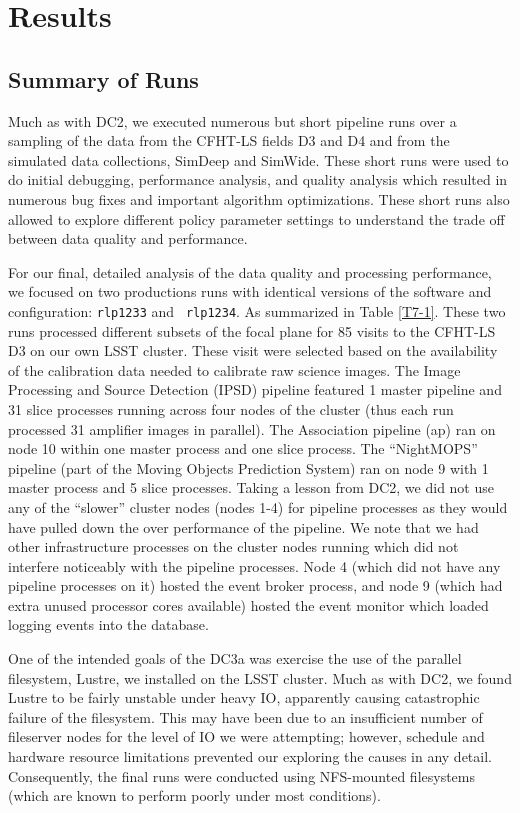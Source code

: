 
\section{Results}

\subsection{Summary of Runs}

Much as with DC2, we executed numerous but short pipeline runs over
a sampling of the data from the CFHT-LS fields D3 and D4 and from the
simulated data collections, SimDeep and SimWide.  These short runs
were used to do initial debugging, performance analysis, and quality
analysis which resulted in numerous bug fixes and important algorithm
optimizations.  These short runs also allowed to explore different
policy parameter settings to understand the trade off between data
quality and performance.  

For our final, detailed analysis of the data quality and processing
performance, we focused on two productions runs with identical
versions of the software and configuration: {\tt rlp1233} and {\tt
rlp1234}.  As summarized in Table \ref{T7-1}.  These two runs
processed different subsets of the focal plane for 85 visits to the
CFHT-LS D3 on our own LSST cluster.  These visit were selected based
on the availability of the calibration data needed to calibrate raw
science images.  The Image Processing and Source Detection (IPSD)
pipeline featured 1 master pipeline and 31 slice processes running
across four nodes of the cluster (thus each run processed 31 amplifier
images in parallel).  The Association pipeline (ap) ran on node 10
within one master process and one slice process.  The ``NightMOPS''
pipeline (part of the Moving Objects Prediction System) ran on node 9
with 1 master process and 5 slice processes.  Taking a lesson from
DC2, we did not use any of the ``slower'' cluster nodes (nodes 1-4)
for pipeline processes as they would have pulled down the over
performance of the pipeline.  We note that we had other infrastructure
processes on the cluster nodes running which did not interfere
noticeably with the pipeline processes.  Node 4 (which did not have
any pipeline processes on it) hosted the event broker process, and
node 9 (which had extra unused processor cores available) hosted the
event monitor which loaded logging events into the database.

One of the intended goals of the DC3a was exercise the use of the
parallel filesystem, Lustre, we installed on the LSST cluster.  Much
as with DC2, we found Lustre to be fairly unstable under heavy IO,
apparently causing catastrophic failure of the filesystem.  This may
have been due to an insufficient number of fileserver nodes for the
level of IO we were attempting; however, schedule and hardware
resource limitations prevented our exploring the causes in any
detail.  Consequently, the final runs were conducted using NFS-mounted
filesystems (which are known to perform poorly under most conditions).  

